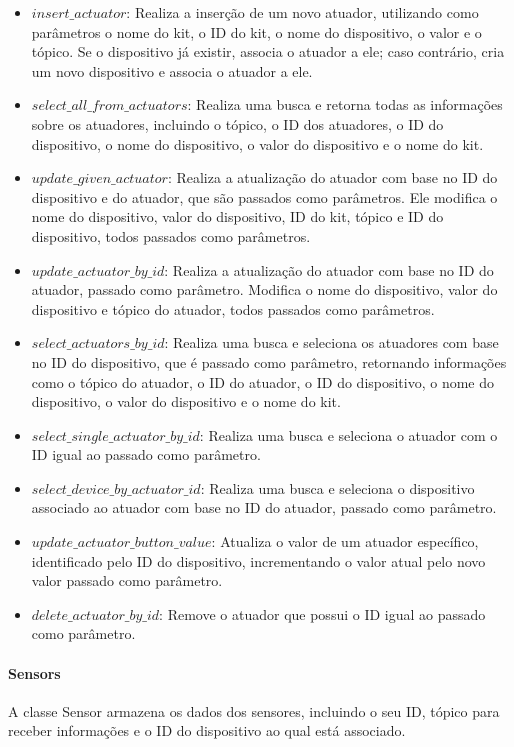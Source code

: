 \documentclass[conference, a4paper, 12pt]{IEEEtran}
\begin{document}
\begin{itemize}
  \item $insert\_actuator$: Realiza a inserção de um novo atuador, utilizando como parâmetros o nome do kit, o ID do kit, o nome do dispositivo, o valor e o tópico. Se o dispositivo já existir, associa o atuador a ele; caso contrário, cria um novo dispositivo e associa o atuador a ele.
  \item $select\_all\_from\_actuators$: Realiza uma busca e retorna todas as informações sobre os atuadores, incluindo o tópico, o ID dos atuadores, o ID do dispositivo, o nome do dispositivo, o valor do dispositivo e o nome do kit.
  \item $update\_given\_actuator$: Realiza a atualização do atuador com base no ID do dispositivo e do atuador, que são passados como parâmetros. Ele modifica o nome do dispositivo, valor do dispositivo, ID do kit, tópico e ID do dispositivo, todos passados como parâmetros.
  \item $update\_actuator\_by\_id$: Realiza a atualização do atuador com base no ID do atuador, passado como parâmetro. Modifica o nome do dispositivo, valor do dispositivo e tópico do atuador, todos passados como parâmetros.
  \item $select\_actuators\_by\_id$: Realiza uma busca e seleciona os atuadores com base no ID do dispositivo, que é passado como parâmetro, retornando informações como o tópico do atuador, o ID do atuador, o ID do dispositivo, o nome do dispositivo, o valor do dispositivo e o nome do kit.
  \item $select\_single\_actuator\_by\_id$: Realiza uma busca e seleciona o atuador com o ID igual ao passado como parâmetro.
  \item $select\_device\_by\_actuator\_id$: Realiza uma busca e seleciona o dispositivo associado ao atuador com base no ID do atuador, passado como parâmetro.
  \item $update\_actuator\_button\_value$: Atualiza o valor de um atuador específico, identificado pelo ID do dispositivo, incrementando o valor atual pelo novo valor passado como parâmetro.
  \item $delete\_actuator\_by\_id$: Remove o atuador que possui o ID igual ao passado como parâmetro.
\end{itemize}

\paragraph{Sensors}
A classe Sensor armazena os dados dos sensores, incluindo o seu ID, tópico para receber informações e o ID do dispositivo ao qual está associado.
\end{document}
